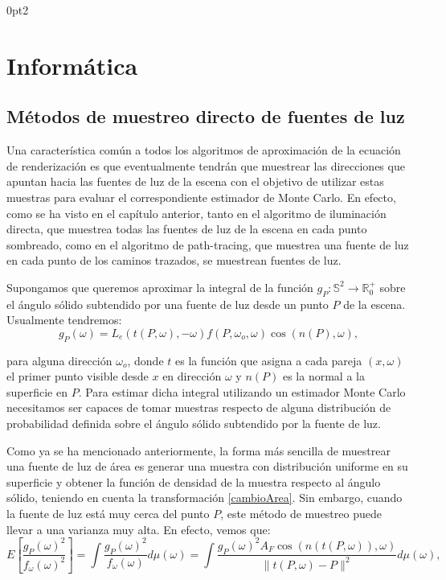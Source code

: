 \titlespacing*{\subsection}
  {0pt}{2\baselineskip}{\baselineskip}

\part{Informática}

\chapter{Métodos de muestreo directo de fuentes de luz}\label{MuestreoDirecto}
Una característica común a todos los algoritmos de aproximación de la ecuación de renderización es que eventualmente tendrán que muestrear las direcciones que apuntan hacia las fuentes de luz de la escena con el objetivo de utilizar estas muestras para evaluar el correspondiente estimador de Monte Carlo. En efecto, como se ha visto en el capítulo anterior, tanto en el algoritmo de iluminación directa, que muestrea todas las fuentes de luz de la escena en cada punto sombreado, como en el algoritmo de path-tracing, que muestrea una fuente de luz en cada punto de los caminos trazados, se muestrean fuentes de luz.

Supongamos que queremos aproximar la integral de la función $g_P:\mathds{S}^2\rightarrow \mathds{R}_0^+$ sobre el ángulo sólido subtendido por una fuente de luz desde un punto $P$ de la escena. Usualmente tendremos:
$$g_P(\omega) = L_e(t(P,\omega), -\omega)f(P,\omega_o,\omega)\cos(n(P),\omega),$$

para alguna dirección $\omega_o$, donde $t$ es la función que asigna a cada pareja $(x,\omega)$ el primer punto visible desde $x$ en dirección $\omega$ y $n(P)$ es la normal a la superficie en $P$. Para estimar dicha integral utilizando un estimador Monte Carlo necesitamos ser capaces de tomar muestras respecto de alguna distribución de probabilidad definida sobre el ángulo sólido subtendido por la fuente de luz.

Como ya se ha mencionado anteriormente, la forma más sencilla de muestrear una fuente de luz de área es generar una muestra con distribución uniforme en su superficie y obtener la función de densidad de la muestra respecto al ángulo sólido, teniendo en cuenta la transformación \ref{cambioArea}. Sin embargo, cuando la fuente de luz está muy cerca del punto $P$, este método de muestreo puede llevar a una varianza muy alta. En efecto, vemos que:
$$E[\frac{g_P(\omega)^2}{f_{\omega}(\omega)^2}] = \int \frac{g_P(\omega)^2}{f_{\omega}(\omega)} d\mu(\omega) = \int \frac{g_P(\omega)^2A_F \cos(n(t(P,\omega)),\omega)}{\|t(P,\omega)-P\|^2} d\mu(\omega),$$

